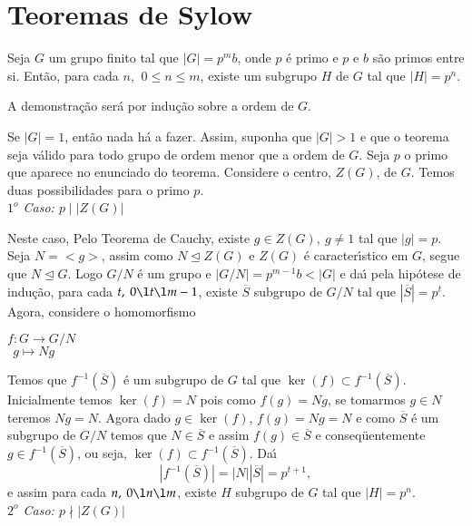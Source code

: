

\section{Teoremas de Sylow} %
\label{sec:teoremas_de_sylow}

\begin{teorema}\label{primeiro_teorema_de_sylow}
Seja $G$ um grupo finito tal que \linebreak $|G| = p^m b$, onde
$p$ {\'e} primo e $p$ e $b$ s{\~a}o primos entre si. Ent{\~a}o, para cada
$n$, $\ 0 \le n \le m$, existe um subgrupo $H$ de $G$ tal que $|H| =
p^n$.
\end{teorema}
\begin{prova}
A demonstra{\c c}{\~a}o ser{\'a} por indu{\c c}{\~a}o sobre a ordem de $G$.

Se $|G| = 1$, ent{\~a}o nada h{\'a} a fazer. Assim, suponha que $|G| > 1$ e
que o teorema seja v{\'a}lido para todo grupo de ordem menor que a ordem de
$G$. Seja $p$ o primo que aparece no enunciado do teorema. Considere o
centro, $Z(G)$, de $G$. Temos duas possibilidades para o primo $p$.\\
\textit{$1^o$ Caso: $p \mid |Z(G)|$}

Neste caso, Pelo Teorema de Cauchy, existe $g \in Z(G),\ g \neq 1$ tal que
$|g| = p$. Seja $N = <g>$, assim como $N \trianglelefteq Z(G)$ e $Z(G)$
{\'e} caracter{\'\i}stico em $G$, segue que $N \trianglelefteq G$. Logo
$G/N$ {\'e} um grupo e $|G/N| = p^{m-1}b < |G|$ e da{\'\i} pela hip{\'o}tese
de indu{\c c}{\~a}o, para cada $t,\ 0 \l t \l m-1$, existe $\overline{S}$
subgrupo de $G/N$ tal que $|\overline{S}| = p^t$. Agora, considere o
homomorfismo 
\begin{center}
$ f: G \to G/N$\\
$\ \ g \mapsto Ng$
\end{center}

Temos que $f^{-1}(\overline{S})$ {\'e} um subgrupo de $G$ tal que $\ker(f)
\subset f^{-1}(\overline{S})$. Inicialmente temos $\ker (f) = N$ pois como
$f(g) = Ng$, se tomarmos $g \in N$  teremos $Ng = N$. Agora dado $g \in \ker
(f)$, $f(g) = Ng = N$ e como $\overline{S}$ {\'e} um subgrupo de $G/N$ temos
que $N \in \overline{S}$ e assim $f(g) \in \overline{S}$ e
conseq{\"u}entemente $g \in f^{-1} (\overline{S})$, ou seja, $\ker (f) \subset
f^{-1}(\overline{S})$. Da{\'\i} $$|f^{-1}(\overline{S})| = |N||\overline{S}|
= p^{t+1},$$ e assim para cada $n,\ 0 \l n \l m$, existe $H$ subgrupo de $G$
tal que $|H| = p^n$.
\vspace{.3cm}\\
\textit{$2^o$ Caso: $p \nmid |Z(G)|$}


\end{prova}
